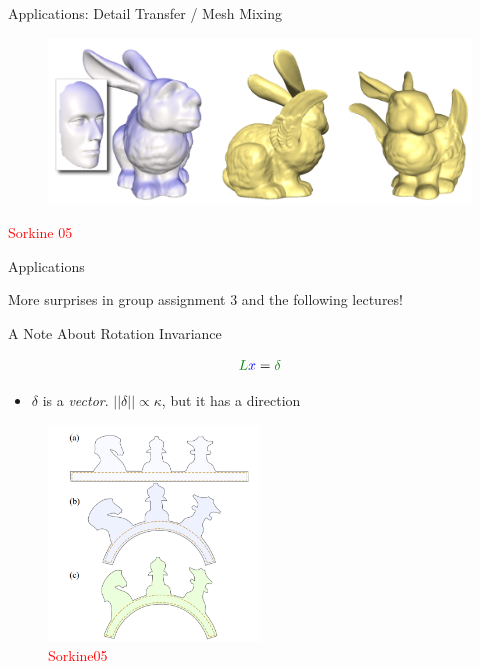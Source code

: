 \documentclass{beamer}
\begin{document}
\begin{frame}{Applications: Detail Transfer / Mesh Mixing}

\begin{figure}[t]
    \includegraphics[width=\textwidth]{Sorkine05_ShapeBlending1.png}
\end{figure}

\textcolor{red}{Sorkine 05}

\end{frame}

\begin{frame}{Applications}

More surprises in group assignment 3 and the following lectures!

\end{frame}

\begin{frame}{A Note About Rotation Invariance}

\[ \textcolor{darkgreen}{L} \textcolor{blue}{x} = \textcolor{darkgreen}{\delta} \]

\begin{itemize}[label=$\vartriangleright$]
\item $\delta$ is a {\em vector}.  $||\delta|| \propto \kappa$, but it has a direction
\end{itemize}

\begin{figure}[t]
    \includegraphics[width=0.5\textwidth]{Sorkine05.png}
    \caption{\textcolor{red}{Sorkine05}}
\end{figure}

\end{frame}
\end{document}
